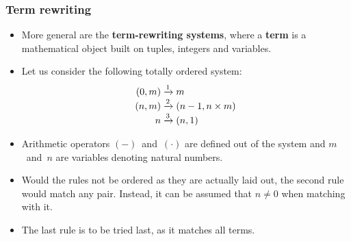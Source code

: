 \documentclass[compress,dvips,xcolor={dvipsnames},t]{beamer}
\begin{document}
\begin{frame}
  \frametitle{Term rewriting}

  \begin{itemize}

    \item More general are the \textbf{term\hyp{}rewriting systems},
      where a \textbf{term} is a mathematical object built on tuples,
      integers and variables.

    \item Let us consider the following totally ordered system:
      \begin{align*}
        (0,m) &\xrightarrow{1} m\\
        (n,m) &\xrightarrow{\smash 2} (n-1, n \times m)\\
        n     &\xrightarrow{\smash 3} (n,1)
      \end{align*}

      \item Arithmetic operators \((-)\)~and~\((\cdot)\) are defined
        out of the system and \(m\)~and~\(n\) are variables denoting
        natural numbers.

      \item Would the rules not be ordered as they are
        actually laid out, the second rule would match any
        pair. Instead, it can be assumed that \(n \neq 0\) when
        matching with it.

      \item The last rule is to be tried last, as it matches all
        terms.

  \end{itemize}
\end{frame}
\end{document}
